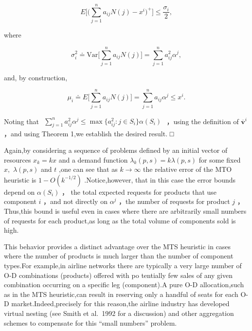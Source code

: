 \[
E \Bigg [ \Bigg ( \sum _ { j = 1 } ^ { n } a _ { i j } N ( j ) - x ^ { i } \Bigg ) ^ { + } \Bigg ] \leqslant \frac { \sigma _ { i } } { 2 } ,
\]

where

\[
\sigma _ { i } ^ { 2 } \doteq \mathrm { V a r } \biggl [ \sum _ { j = 1 } ^ { n } a _ { i j } N ( j ) \biggr ] = \sum _ { j = 1 } ^ { n } a _ { i j } ^ { 2 } \alpha ^ { j } ,
\]

and, by construction,

\[
\mu _ { i } \doteq E { \biggl [ } \sum _ { j = 1 } ^ { n } a _ { i j } N ( j ) { \biggr ] } = \sum _ { j = 1 } ^ { n } a _ { i j } \alpha ^ { j } \leqslant x ^ { i } .
\]

Noting that
\(\begin{array} { r } { \sum _ { j = 1 } ^ { n } a _ { i j } ^ { 2 } \alpha ^ { j } \leqslant \operatorname* { m a x } \{ a _ { i j } ^ { 2 } \colon j \in S _ { i } \} \alpha ( S _ { i } ) } \end{array}\)
，using the definition of
\(\overline { { \boldsymbol { v } } } ^ { i }\) ，and using Theorem 1,we
establish the desired result. □

Again,by considering a sequence of problems defined by an initial vector
of resources \(x _ { k } = k x\) and a demand function
\(\lambda _ { k } ( p , s ) = k \lambda ( p , s )\) for some fixed
\(x ,\) \(\lambda ( p , s )\) and \(t\) ,one can see that as
\(k \to \infty\) the relative error of the MTO heuristic is
\(1 - O ( k ^ { - 1 / 2 } )\) .Notice,however, that in this case the
error bounds depend on \(\alpha ( S _ { i } )\) ， the total expected
requests for products that use component \(i\) ，and not directly on
\(\alpha ^ { j }\) ，the number of requests for product \(j\)
，Thus,this bound is useful even in cases where there are arbitrarily
small numbers of requests for each product,as long as the total volume
of components sold is high.

This behavior provides a distinct advantage over the MTS heuristic in
cases where the number of products is much larger than the number of
component types.For example,in airline networks there are typically a
very large number of O-D combinations (products) offered with po
tentially few sales of any given combination occurring on a specific leg
(component).A pure O-D allocation,such as in the MTS heuristic,can
result in reserving only a handful of seats for each O-D
market.Indeed,precisely for this reason,the airline industry has
developed virtual nesting (see Smith et al.~1992 for a discussion) and
other aggregation schemes to compensate for this ``small numbers''
problem.

